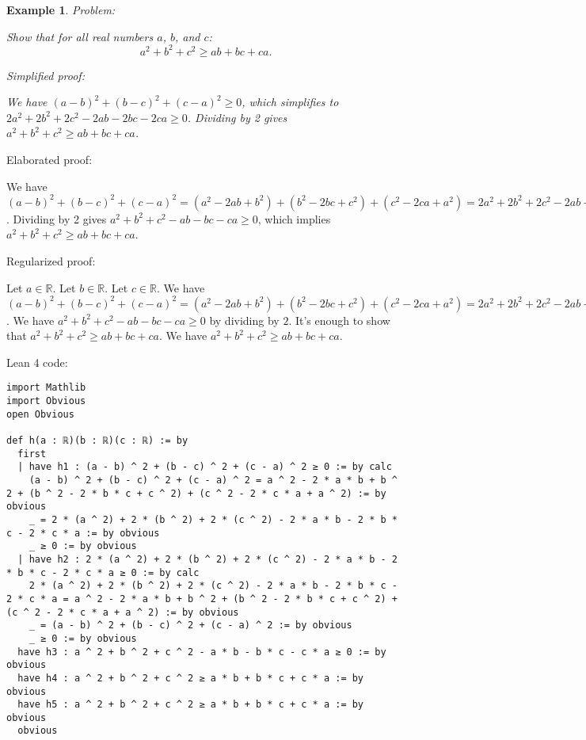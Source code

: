 \documentclass{article}
\newtheorem{example}{Example}
\begin{document}
\begin{example}
Problem:
\begin{tcolorbox}[colback=yellow!10, width=\linewidth]
Show that for all real numbers $a$, $b$, and $c$:
    $$a^2 + b^2 + c^2 \geq ab + bc + ca.$$
\end{tcolorbox}

Simplified proof:
\begin{tcolorbox}[colback=blue!10, width=\linewidth]
We have $(a-b)^2 + (b-c)^2 + (c-a)^2 \geq 0$, which simplifies to $2a^2 + 2b^2 + 2c^2 - 2ab - 2bc - 2ca \geq 0$. Dividing by 2 gives $a^2 + b^2 + c^2 \geq ab + bc + ca$.
\end{tcolorbox}
\end{example}

Elaborated proof:
\begin{tcolorbox}[colback=green!10, width=\linewidth]
We have $(a-b)^2 + (b-c)^2 + (c-a)^2 = (a^2 - 2ab + b^2) + (b^2 - 2bc + c^2) + (c^2 - 2ca + a^2) = 2a^2 + 2b^2 + 2c^2 - 2ab - 2bc - 2ca \geq 0$. Dividing by 2 gives $a^2 + b^2 + c^2 - ab - bc - ca \geq 0$, which implies $a^2 + b^2 + c^2 \geq ab + bc + ca$.
\end{tcolorbox}

Regularized proof:
\begin{tcolorbox}[colback=red!10, width=\linewidth]
Let $a\in\mathbb{R}$.
Let $b\in\mathbb{R}$.
Let $c\in\mathbb{R}$.
We have ${{(a-b)}}^2 + {{(b-c)}}^2 + {{(c-a)}}^2 = (a^2 - 2ab + b^2) + (b^2 - 2bc + c^2) + (c^2 - 2ca + a^2) = 2a^2 + 2b^2 + 2c^2 - 2ab - 2bc - 2ca \geq 0$. We have $a^2 + b^2 + c^2 - ab - bc - ca \geq 0$ by dividing by $2$.  It's enough to show that $a^2 + b^2 + c^2 \geq ab + bc + ca$. We have $a^2 + b^2 + c^2 \geq ab + bc + ca$.
\end{tcolorbox}

Lean 4 code:
\begin{tcolorbox}[colback=white!10, width=\linewidth]
\begin{lstlisting}[language=Lean4]
import Mathlib
import Obvious
open Obvious

def h(a : ℝ)(b : ℝ)(c : ℝ) := by
  first
  | have h1 : (a - b) ^ 2 + (b - c) ^ 2 + (c - a) ^ 2 ≥ 0 := by calc
    (a - b) ^ 2 + (b - c) ^ 2 + (c - a) ^ 2 = a ^ 2 - 2 * a * b + b ^ 2 + (b ^ 2 - 2 * b * c + c ^ 2) + (c ^ 2 - 2 * c * a + a ^ 2) := by obvious
    _ = 2 * (a ^ 2) + 2 * (b ^ 2) + 2 * (c ^ 2) - 2 * a * b - 2 * b * c - 2 * c * a := by obvious
    _ ≥ 0 := by obvious
  | have h2 : 2 * (a ^ 2) + 2 * (b ^ 2) + 2 * (c ^ 2) - 2 * a * b - 2 * b * c - 2 * c * a ≥ 0 := by calc
    2 * (a ^ 2) + 2 * (b ^ 2) + 2 * (c ^ 2) - 2 * a * b - 2 * b * c - 2 * c * a = a ^ 2 - 2 * a * b + b ^ 2 + (b ^ 2 - 2 * b * c + c ^ 2) + (c ^ 2 - 2 * c * a + a ^ 2) := by obvious
    _ = (a - b) ^ 2 + (b - c) ^ 2 + (c - a) ^ 2 := by obvious
    _ ≥ 0 := by obvious
  have h3 : a ^ 2 + b ^ 2 + c ^ 2 - a * b - b * c - c * a ≥ 0 := by obvious
  have h4 : a ^ 2 + b ^ 2 + c ^ 2 ≥ a * b + b * c + c * a := by obvious
  have h5 : a ^ 2 + b ^ 2 + c ^ 2 ≥ a * b + b * c + c * a := by obvious
  obvious

\end{lstlisting}
\end{tcolorbox}
\end{document}
